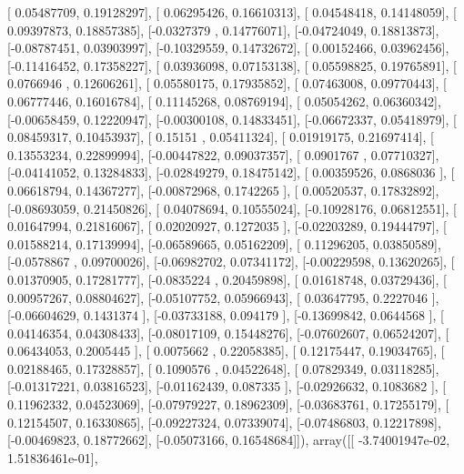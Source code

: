 \documentclass{article}
\begin{document}
       [ 0.05487709,  0.19128297],
       [ 0.06295426,  0.16610313],
       [ 0.04548418,  0.14148059],
       [ 0.09397873,  0.18857385],
       [-0.0327379 ,  0.14776071],
       [-0.04724049,  0.18813873],
       [-0.08787451,  0.03903997],
       [-0.10329559,  0.14732672],
       [ 0.00152466,  0.03962456],
       [-0.11416452,  0.17358227],
       [ 0.03936098,  0.07153138],
       [ 0.05598825,  0.19765891],
       [ 0.0766946 ,  0.12606261],
       [ 0.05580175,  0.17935852],
       [ 0.07463008,  0.09770443],
       [ 0.06777446,  0.16016784],
       [ 0.11145268,  0.08769194],
       [ 0.05054262,  0.06360342],
       [-0.00658459,  0.12220947],
       [-0.00300108,  0.14833451],
       [-0.06672337,  0.05418979],
       [ 0.08459317,  0.10453937],
       [ 0.15151   ,  0.05411324],
       [ 0.01919175,  0.21697414],
       [ 0.13553234,  0.22899994],
       [-0.00447822,  0.09037357],
       [ 0.0901767 ,  0.07710327],
       [-0.04141052,  0.13284833],
       [-0.02849279,  0.18475142],
       [ 0.00359526,  0.0868036 ],
       [ 0.06618794,  0.14367277],
       [-0.00872968,  0.1742265 ],
       [ 0.00520537,  0.17832892],
       [-0.08693059,  0.21450826],
       [ 0.04078694,  0.10555024],
       [-0.10928176,  0.06812551],
       [ 0.01647994,  0.21816067],
       [ 0.02020927,  0.1272035 ],
       [-0.02203289,  0.19444797],
       [ 0.01588214,  0.17139994],
       [-0.06589665,  0.05162209],
       [ 0.11296205,  0.03850589],
       [-0.0578867 ,  0.09700026],
       [-0.06982702,  0.07341172],
       [-0.00229598,  0.13620265],
       [ 0.01370905,  0.17281777],
       [-0.0835224 ,  0.20459898],
       [ 0.01618748,  0.03729436],
       [ 0.00957267,  0.08804627],
       [-0.05107752,  0.05966943],
       [ 0.03647795,  0.2227046 ],
       [-0.06604629,  0.1431374 ],
       [-0.03733188,  0.094179  ],
       [-0.13699842,  0.0644568 ],
       [ 0.04146354,  0.04308433],
       [-0.08017109,  0.15448276],
       [-0.07602607,  0.06524207],
       [ 0.06434053,  0.2005445 ],
       [ 0.0075662 ,  0.22058385],
       [ 0.12175447,  0.19034765],
       [ 0.02188465,  0.17328857],
       [ 0.1090576 ,  0.04522648],
       [ 0.07829349,  0.03118285],
       [-0.01317221,  0.03816523],
       [-0.01162439,  0.087335  ],
       [-0.02926632,  0.1083682 ],
       [ 0.11962332,  0.04523069],
       [-0.07979227,  0.18962309],
       [-0.03683761,  0.17255179],
       [ 0.12154507,  0.16330865],
       [-0.09227324,  0.07339074],
       [-0.07486803,  0.12217898],
       [-0.00469823,  0.18772662],
       [-0.05073166,  0.16548684]]), array([[ -3.74001947e-02,   1.51836461e-01],
\end{document}
